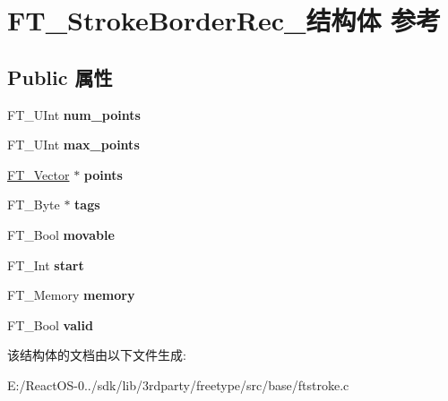 \hypertarget{struct_f_t___stroke_border_rec__}{}\section{F\+T\+\_\+\+Stroke\+Border\+Rec\+\_\+结构体 参考}
\label{struct_f_t___stroke_border_rec__}
\subsection*{Public 属性}
\begin{DoxyCompactItemize}
\item 
\mbox{\label{struct_f_t___stroke_border_rec___a353a733f4c956225ed22dde9c1dd7650}} 
F\+T\+\_\+\+U\+Int {\bfseries num\+\_\+points}
\item 
\mbox{\label{struct_f_t___stroke_border_rec___ac54e15e3630fdc81a1094f504711d1ac}} 
F\+T\+\_\+\+U\+Int {\bfseries max\+\_\+points}
\item 
\mbox{\label{struct_f_t___stroke_border_rec___aff32e03c8c8ea7c27ed55acaead10c56}} 
\hyperlink{struct_f_t___vector__}{F\+T\+\_\+\+Vector} $\ast$ {\bfseries points}
\item 
\mbox{\label{struct_f_t___stroke_border_rec___a9ff778288026c62730b7cfd13e2c209e}} 
F\+T\+\_\+\+Byte $\ast$ {\bfseries tags}
\item 
\mbox{\label{struct_f_t___stroke_border_rec___a5dfee69b03dc25621f9ff4d48ad2f666}} 
F\+T\+\_\+\+Bool {\bfseries movable}
\item 
\mbox{\label{struct_f_t___stroke_border_rec___ab8e20ce116e574a92ef945bb6a7113d5}} 
F\+T\+\_\+\+Int {\bfseries start}
\item 
\mbox{\label{struct_f_t___stroke_border_rec___ac3694464157f84bef0c0ff40668b1bb6}} 
F\+T\+\_\+\+Memory {\bfseries memory}
\item 
\mbox{\label{struct_f_t___stroke_border_rec___a23fa7b9bd34745e0477b5d17e889b852}} 
F\+T\+\_\+\+Bool {\bfseries valid}
\end{DoxyCompactItemize}


该结构体的文档由以下文件生成\+:\begin{DoxyCompactItemize}
\item 
E\+:/\+React\+O\+S-\/0../sdk/lib/3rdparty/freetype/src/base/ftstroke.\+c\end{DoxyCompactItemize}

